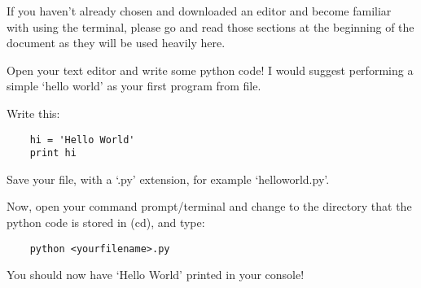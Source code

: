 If you haven't already chosen and downloaded an editor and become familiar with
using the terminal, please go and read those sections at the beginning of the
document as they will be used heavily here.

Open your text editor and write some python code! I would suggest performing a
simple `hello world' as your first program from file.

Write this:
\begin{lstlisting}
    hi = 'Hello World'
    print hi
\end{lstlisting}

Save your file, with a `.py' extension, for example `helloworld.py'.

Now, open your command prompt/terminal and change to the directory that the
python code is stored in (cd), and type:

\begin{lstlisting}
    python <yourfilename>.py
\end{lstlisting}

You should now have `Hello World' printed in your console!


